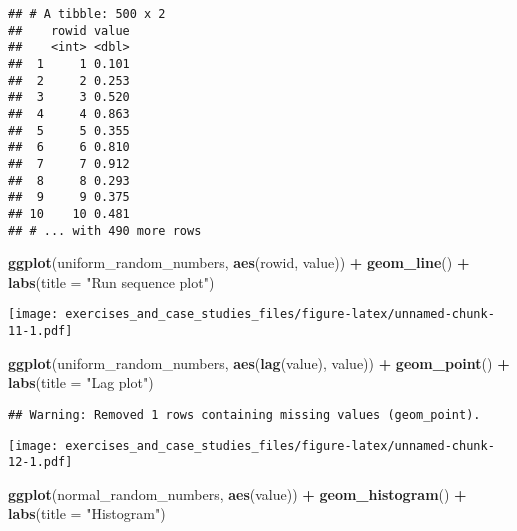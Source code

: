 \documentclass[]{book}
\newenvironment{Shaded}{\begin{snugshade}}{\end{snugshade}}
\newcommand{\DataTypeTok}[1]{\textcolor[rgb]{0.13,0.29,0.53}{#1}}
\newcommand{\KeywordTok}[1]{\textcolor[rgb]{0.13,0.29,0.53}{\textbf{#1}}}
\newcommand{\NormalTok}[1]{#1}
\newcommand{\OperatorTok}[1]{\textcolor[rgb]{0.81,0.36,0.00}{\textbf{#1}}}
\newcommand{\StringTok}[1]{\textcolor[rgb]{0.31,0.60,0.02}{#1}}
\theoremstyle{definition}
\theoremstyle{definition}
\theoremstyle{definition}
\theoremstyle{remark}
\begin{document}
\begin{verbatim}
## # A tibble: 500 x 2
##    rowid value
##    <int> <dbl>
##  1     1 0.101
##  2     2 0.253
##  3     3 0.520
##  4     4 0.863
##  5     5 0.355
##  6     6 0.810
##  7     7 0.912
##  8     8 0.293
##  9     9 0.375
## 10    10 0.481
## # ... with 490 more rows
\end{verbatim}

\begin{Shaded}
\begin{Highlighting}[]
\KeywordTok{ggplot}\NormalTok{(uniform_random_numbers, }\KeywordTok{aes}\NormalTok{(rowid, value)) }\OperatorTok{+}
\StringTok{  }\KeywordTok{geom_line}\NormalTok{() }\OperatorTok{+}
\StringTok{  }\KeywordTok{labs}\NormalTok{(}\DataTypeTok{title =} \StringTok{"Run sequence plot"}\NormalTok{)}
\end{Highlighting}
\end{Shaded}

\texttt{[image: exercises\_and\_case\_studies\_files/figure-latex/unnamed-chunk-11-1.pdf]}

\begin{Shaded}
\begin{Highlighting}[]
\KeywordTok{ggplot}\NormalTok{(uniform_random_numbers, }\KeywordTok{aes}\NormalTok{(}\KeywordTok{lag}\NormalTok{(value), value)) }\OperatorTok{+}
\StringTok{  }\KeywordTok{geom_point}\NormalTok{() }\OperatorTok{+}
\StringTok{  }\KeywordTok{labs}\NormalTok{(}\DataTypeTok{title =} \StringTok{"Lag plot"}\NormalTok{)}
\end{Highlighting}
\end{Shaded}

\begin{verbatim}
## Warning: Removed 1 rows containing missing values (geom_point).
\end{verbatim}

\texttt{[image: exercises\_and\_case\_studies\_files/figure-latex/unnamed-chunk-12-1.pdf]}

\begin{Shaded}
\begin{Highlighting}[]
\KeywordTok{ggplot}\NormalTok{(normal_random_numbers, }\KeywordTok{aes}\NormalTok{(value)) }\OperatorTok{+}
\StringTok{  }\KeywordTok{geom_histogram}\NormalTok{() }\OperatorTok{+}
\StringTok{  }\KeywordTok{labs}\NormalTok{(}\DataTypeTok{title =} \StringTok{"Histogram"}\NormalTok{)}
\end{Highlighting}
\end{Shaded}
\end{document}

